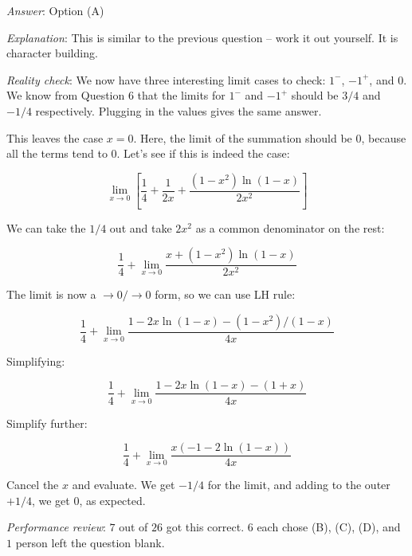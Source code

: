 \documentclass[10pt]{amsart}
\begin{document}
\begin{enumerate}
  {\em Answer}: Option (A)

  {\em Explanation}: This is similar to the previous question -- work
  it out yourself. It is character building.

  {\em Reality check}: We now have three interesting limit cases to
  check: $1^-$, $-1^+$, and $0$. We know from Question 6 that the
  limits for $1^-$ and $-1^+$ should be $3/4$ and $-1/4$
  respectively. Plugging in the values gives the same answer.

  This leaves the case $x = 0$. Here, the limit of the summation
  should be $0$, because all the terms tend to $0$. Let's see if this
  is indeed the case:

  $$\lim_{x \to 0} \left[\frac{1}{4} + \frac{1}{2x} + \frac{(1 - x^2)\ln(1 - x)}{2x^2}\right]$$

  We can take the $1/4$ out and take $2x^2$ as a common denominator on
  the rest:

  $$\frac{1}{4}  + \lim_{x \to 0} \frac{x + (1 - x^2)\ln(1 - x)}{2x^2}$$

  The limit is now a $\to 0/\to 0$ form, so we can use LH rule:

  $$\frac{1}{4} + \lim_{x \to 0} \frac{1 - 2x\ln(1 - x) - (1 - x^2)/(1 - x)}{4x}$$

  Simplifying:

  $$\frac{1}{4} + \lim_{x \to 0} \frac{1 - 2x\ln(1 - x) - (1 + x)}{4x}$$
  
  Simplify further:

  $$\frac{1}{4} + \lim_{x \to 0} \frac{x(-1 - 2\ln(1 - x))}{4x}$$

  Cancel the $x$ and evaluate. We get $-1/4$ for the limit, and adding
  to the outer $+1/4$, we get $0$, as expected.

  {\em Performance review}: $7$ out of $26$ got this correct. $6$ each
  chose (B), (C), (D), and $1$ person left the question blank.
\end{enumerate}
\end{document}
